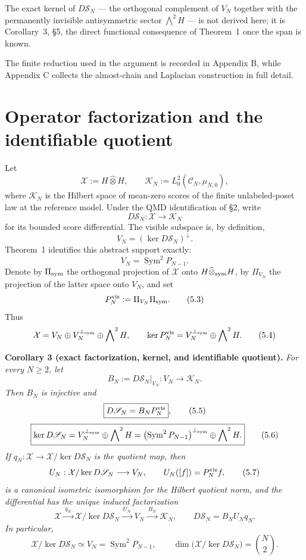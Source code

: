 \documentclass[11pt]{article}
\begin{document}
The exact kernel of $D\mathscr S_N$ --- the orthogonal complement of $V_N$ together with the permanently invisible antisymmetric sector $\bigwedge^2H$ --- is not derived here; it is Corollary~3, \S5, the direct functional consequence of Theorem~1 once the span is known.

The finite reduction used in the argument is recorded in Appendix B, while Appendix C collects the almost-chain and Laplacian construction in full detail.

\section{Operator factorization and the identifiable quotient}

Let \[ \mathcal X:=H\widehat\otimes H, \qquad \mathcal K_N:=L_0^2(\mathcal C_N,\mu_{N,0}), \] where \(\mathcal K_N\) is the Hilbert space of mean-zero scores of the finite unlabeled-poset law at the reference model. Under the QMD identification of \S2, write \[ D\mathscr S_N:\mathcal X\longrightarrow\mathcal K_N \] for its bounded score differential. The visible subspace is, by definition, \[ V_N=(\ker D\mathscr S_N)^\perp. \tag{5.1} \] Theorem~1 identifies this abstract support exactly: \[ V_N=\operatorname{Sym}^2P_{N-1}. \tag{5.2} \] Denote by \(\Pi_{\rm sym}\) the orthogonal projection of \(\mathcal X\) onto \(H\widehat\otimes_{\rm sym}H\), by \(\Pi_{V_N}\) the projection of the latter space onto \(V_N\), and set \[ P_N^{\rm vis}:=\Pi_{V_N}\Pi_{\rm sym}. \tag{5.3} \] Thus \[ \mathcal X =V_N\oplus V_N^{\perp_{\rm sym}} \oplus\bigwedge\nolimits^2H, \qquad \ker P_N^{\rm vis} =V_N^{\perp_{\rm sym}}\oplus\bigwedge\nolimits^2H. \tag{5.4} \]

\textbf{Corollary 3 (exact factorization, kernel, and identifiable quotient).} \emph{For every \(N\ge2\), let} \[ B_N:=D\mathscr S_N|_{V_N}:V_N\longrightarrow\mathcal K_N. \] \emph{Then \(B_N\) is injective and} \[ \boxed{D\mathscr S_N=B_NP_N^{\rm vis}}, \tag{5.5} \] \[ \boxed{ \ker D\mathscr S_N =V_N^{\perp_{\rm sym}}\oplus\bigwedge\nolimits^2H =\left(\operatorname{Sym}^2P_{N-1}\right)^{\perp_{\rm sym}} \oplus\bigwedge\nolimits^2H.} \tag{5.6} \] \emph{If \(q_N:\mathcal X\to\mathcal X/\ker D\mathscr S_N\) is the quotient map, then} \[ U_N:\mathcal X/\ker D\mathscr S_N\longrightarrow V_N, \qquad U_N([f])=P_N^{\rm vis}f, \tag{5.7} \] \emph{is a canonical isometric isomorphism for the Hilbert quotient norm, and the differential has the unique induced factorization} \[ \mathcal X\xrightarrow{\ q_N\ } \mathcal X/\ker D\mathscr S_N \xrightarrow{\ U_N\ }V_N \xrightarrow{\ B_N\ }\mathcal K_N, \qquad D\mathscr S_N=B_NU_Nq_N. \tag{5.8} \] \emph{In particular,} \[ \boxed{ \mathcal X/\ker D\mathscr S_N \simeq V_N=\operatorname{Sym}^2P_{N-1}, \qquad \dim\bigl(\mathcal X/\ker D\mathscr S_N\bigr)=\binom N2.} \tag{5.9} \]
\end{document}
